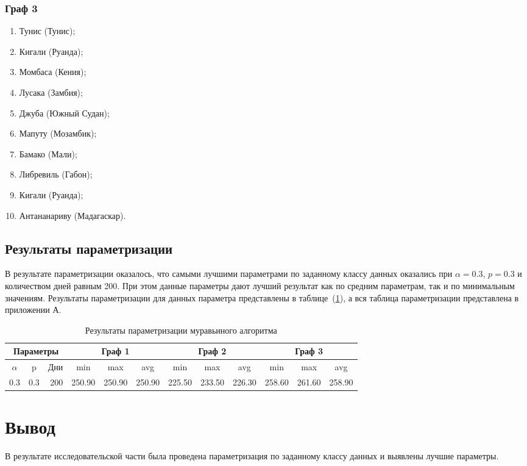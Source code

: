 \subsubsection{Граф 3}
\begin{enumerate}
	\item Тунис (Тунис);
	\item Кигали (Руанда);
	\item Момбаса (Кения);
	\item Лусака (Замбия);
	\item Джуба (Южный Судан);
	\item Мапуту (Мозамбик);
	\item Бамако (Мали);
	\item Либревиль (Габон);
	\item Кигали (Руанда);
	\item Антананариву (Мадагаскар).
\end{enumerate}

\subsection{Результаты параметризации}

В результате параметризации оказалось, что самыми лучшими параметрами по заданному классу данных оказались при $\alpha = 0.3$, $p = 0.3$ и количеством дней равным 200. При этом данные параметры дают лучший результат как по средним параметрам, так и по минимальным значениям. Результаты параметризации для данных параметра представлены в таблице~(\ref{tbl:d}), а вся таблица параметризации представлена в приложении А.

\begin{longtable}{|r|r|r|r|r|r|r|r|r|r|r|r|}
	\caption{Результаты параметризации муравьиного алгоритма}\label{tbl:d}
	\\
	\hline
	\multicolumn{3}{|c|}{Параметры} & \multicolumn{3}{|c|}{Граф 1} & \multicolumn{3}{|c|}{Граф 2} & \multicolumn{3}{|c|}{Граф 3} \\
	\hline
	\multicolumn{1}{|c|}{$\alpha$} & \multicolumn{1}{|c|}{p} & \multicolumn{1}{|c|}{Дни} & \multicolumn{1}{|c|}{min} & \multicolumn{1}{|c|}{max} & \multicolumn{1}{|c|}{avg} & \multicolumn{1}{|c|}{min} & \multicolumn{1}{|c|}{max} & \multicolumn{1}{|c|}{avg} & \multicolumn{1}{|c|}{min} & \multicolumn{1}{|c|}{max} & \multicolumn{1}{|c|}{avg} \\
	\endfirsthead
	\hline
	0.3 & 0.3 & 200 & 250.90 & 250.90 & 250.90 & 225.50 & 233.50 & 226.30 & 258.60 & 261.60 & 258.90\\
	\hline
\end{longtable}

\section{Вывод}

В результате исследовательской части была проведена параметризация по заданному классу данных и выявлены лучшие параметры.

\clearpage
